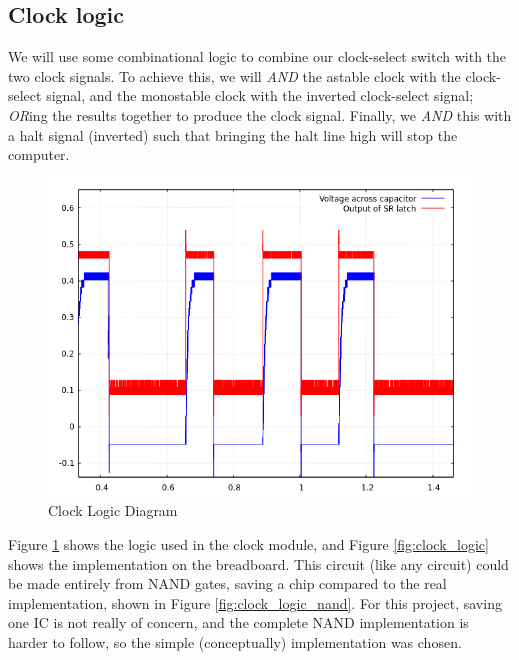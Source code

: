 \documentclass[12pt]{article}
\begin{document}
\begin{FlushLeft}
\subsection{Clock logic}
We will use some combinational logic to combine our clock-select switch with the two clock signals. To achieve this, we will \textit{AND} the astable clock with the clock-select signal, and the monostable clock with the inverted clock-select signal; \textit{OR}ing the results together to produce the clock signal. Finally, we \textit{AND} this with a halt signal (inverted) such that bringing the halt line high will stop the computer. \\

\begin{figure}[h]
  \begin{center}
    \includegraphics[width=0.9\linewidth]{../modules/clock/monostable_scope.png}
    \caption{Clock Logic Diagram}
    \label{fig:clock_logic_diagram}
  \end{center}
\end{figure}

Figure \ref{fig:clock_logic_diagram} shows the logic used in the clock module, and Figure \ref{fig:clock_logic} shows the implementation on the breadboard. This circuit (like any circuit) could be made entirely from NAND gates, saving a chip compared to the real implementation, shown in Figure \ref{fig:clock_logic_nand}. For this project, saving one IC is not really of concern, and the complete NAND implementation is harder to follow, so the simple (conceptually) implementation was chosen.


\end{FlushLeft}

\clearpage
\end{document}
